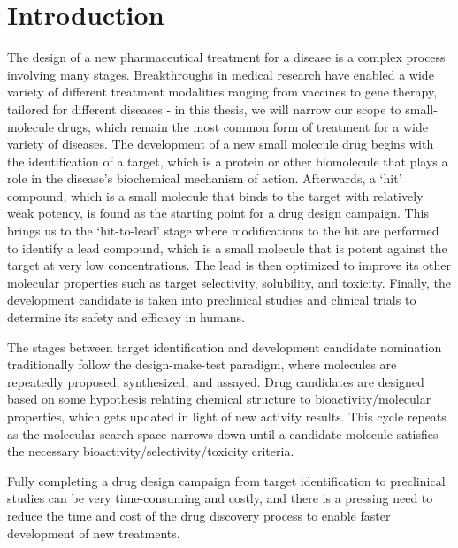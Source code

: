 \chapter{Introduction} \label{ch:intro}

The design of a new pharmaceutical treatment for a disease is a complex process involving many stages. Breakthroughs in medical research have enabled a wide variety of different treatment modalities ranging from vaccines to gene therapy, tailored for different diseases - in this thesis, we will narrow our scope to small-molecule drugs, which remain the most common form of treatment for a wide variety of diseases. The development of a new small molecule drug begins with the identification of a target, which is a protein or other biomolecule that plays a role in the disease's biochemical mechanism of action. Afterwards, a `hit' compound, which is a small molecule that binds to the target with relatively weak potency, is found as the starting point for a drug design campaign. This brings us to the `hit-to-lead' stage where modifications to the hit are performed to identify a lead compound, which is a small molecule that is potent against the target at very low concentrations. The lead is then optimized to improve its other molecular properties such as target selectivity, solubility, and toxicity. Finally, the development candidate is taken into preclinical studies and clinical trials to determine its safety and efficacy in humans.

The stages between target identification and development candidate nomination traditionally follow the design-make-test paradigm, where molecules are repeatedly proposed, synthesized, and assayed. Drug candidates are designed based on some hypothesis relating chemical structure to bioactivity/molecular properties, which gets updated in light of new activity results. This cycle repeats as the molecular search space narrows down until a candidate molecule satisfies the necessary bioactivity/selectivity/toxicity criteria.

Fully completing a drug design campaign from target identification to preclinical studies can be very time-consuming and costly, and there is a pressing need to reduce the time and cost of the drug discovery process to enable faster development of new treatments.


